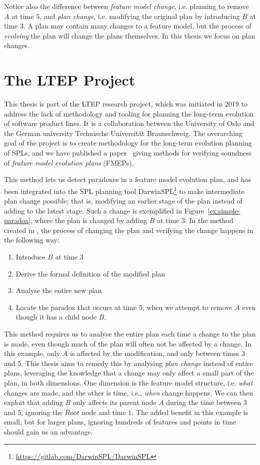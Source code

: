 Notice also the difference between \emph{feature model change}, i.e. planning to remove $A$ at time $5$, and \emph{plan change}, i.e. modifying the original plan by introducing $B$ at time 3. A plan may contain many changes to a feature model, but the process of \emph{evolving} the plan will change the plans themselves. In this thesis we focus on plan changes.

\section{The LTEP Project}
\label{sec:the-ltep-project}
This thesis is part of the LTEP research project, which was initiated in 2019 to address the lack of methodology and tooling for planning the long-term evolution of software product lines. It is a collaboration between the University of Oslo and the German university Technische Universität Braunschweig. The overarching goal of the project is to create methodology for the long-term evolution planning of SPLs, and we have published a paper~\cite{art:consistency-preserving-evolution-planning} giving methods for verifying soundness of \emph{feature model evolution plans} (FMEPs). 

This method lets us detect paradoxes in a feature model evolution plan, and has been integrated into the SPL planning tool DarwinSPL\footnote{\url{https://gitlab.com/DarwinSPL/DarwinSPL}} to make intermediate plan change possible; that is, modifying an earlier stage of the plan instead of adding to the latest stage. Such a change is exemplified in Figure~\ref{ex:simple-paradox}, where the plan is changed by adding $B$ at time $3$. In the method created in \cite{art:consistency-preserving-evolution-planning}, the process of changing the plan and verifying the change happens in the following way:
\begin{enumerate}[1)]
   \item Introduce $B$ at time $3$
   \item Derive the formal definition of the modified plan
   \item Analyse the entire new plan
   \item Locate the paradox that occurs at time 5, when we attempt to remove $A$ even though it has a child node $B$.
\end{enumerate}
This method requires us to analyse the entire plan each time a change to the plan is made, even though much of the plan will often not be affected by a change. In this example, only $A$ is affected by the modification, and only between times 3 and 5. This thesis aims to remedy this by analysing \emph{plan change} instead of entire plans, leveraging the knowledge that a change may only affect a small part of the plan, in both dimensions. One dimension is the feature model structure, i.e. \emph{what} changes are made, and the other is time, i.e., \emph{when} change happens.  We can then exploit that adding $B$ only affects its parent node $A$ during the time between 3 and 5, ignoring the $Root$ node and time $1$. The added benefit in this example is small, but for larger plans, ignoring hundreds of features and points in time should gain us an advantage.

